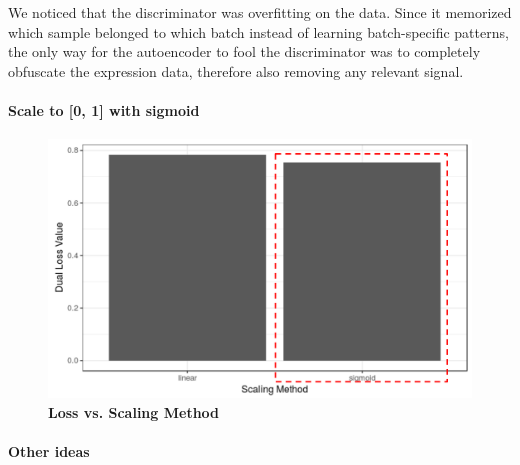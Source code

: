 \documentclass{article}
\begin{document}
We noticed that the discriminator was overfitting on the data.
Since it memorized which sample belonged to which batch instead of learning batch-specific patterns, the only way for the autoencoder to fool the discriminator was to completely obfuscate the expression data, therefore also removing any relevant signal.

\paragraph{Scale to [0, 1] with sigmoid}

\begin{figure}
	\centering
	\includegraphics[width=\columnwidth]{figures/supplement/scaling.png}
	\caption{\textbf{Loss vs. Scaling Method}
	}
	\label{fig:scaling}
\end{figure}



\paragraph{Other ideas}
\end{document}
